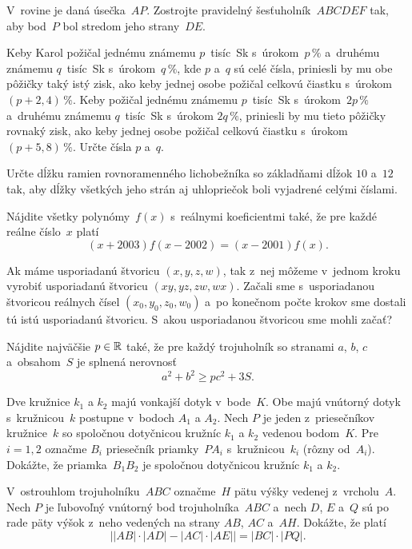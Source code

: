 {%
V~rovine je daná úsečka~$AP$. Zostrojte pravidelný šesťuholník~$ABCDEF$ tak, aby bod~$P$ bol stredom jeho strany~$DE$.}

{%
Keby Karol požičal jednému známemu $p$~tisíc~Sk s~úrokom~$p\,\%$ a~druhému známemu $q$~tisíc~Sk s~úrokom~$q\,\%$, kde $p$ a~$q$ sú celé čísla, priniesli by mu obe pôžičky taký istý zisk, ako keby jednej osobe požičal celkovú čiastku s~úrokom~$(p + 2{,}4)\,\%$. Keby požičal jednému známemu $p$~tisíc~Sk s~úrokom~$2p\,\%$ a~druhému známemu $q$~tisíc~Sk s~úrokom $2q\,\%$, priniesli by mu tieto pôžičky rovnaký zisk, ako keby jednej osobe požičal celkovú čiastku s~úrokom~$(p + 5{,}8)\,\%$. Určte čísla $p$ a~$q$.}

{%
Určte dĺžku ramien rovnoramenného lichobežníka so základňami dĺžok $10$ a~$12$ tak, aby dĺžky všetkých jeho strán aj uhlopriečok boli vyjadrené celými číslami.}

{%
Nájdite všetky polynómy~$f(x)$ s~reálnymi koeficientmi také, že pre každé
reálne číslo~$x$ platí
$$ (x+2003) f(x-2002) = (x-2001) f(x).$$}

{%
Ak máme usporiadanú štvoricu $(x,y,z,w)$, tak z~nej môžeme v~jednom kroku
vyrobiť usporiadanú štvoricu $(xy,yz,zw,wx)$.
Začali sme s~usporiadanou štvoricou reálnych čísel
$(x_0,y_0,z_0,w_0)$ a~po konečnom počte krokov sme dostali tú istú
usporiadanú štvoricu. S~akou usporiadanou štvoricou sme mohli začať?}

{%
Nájdite najväčšie $p \in \Bbb R$ také, že pre každý trojuholník
so stranami $a$, $b$, $c$ a~obsahom~$S$ je splnená nerovnosť
$$ a^2 + b^2 \ge pc^2 +3S.$$}

{%
Dve kružnice $k_1$ a $k_2$ majú vonkajší dotyk v~bode~$K$. Obe majú vnútorný dotyk
s~kružnicou~$k$ postupne v~bodoch $A_1$ a $A_2$. Nech $P$ je jeden z~priesečníkov
kružnice~$k$ so spoločnou dotyčnicou kružníc $k_1$ a $k_2$ vedenou bodom~$K$.
Pre $i=1,2$ označme $B_i$ priesečník priamky~$PA_i$ s~kružnicou~$k_i$ (rôzny od~$A_i$).
Dokážte, že priamka~$B_1B_2$ je spoločnou dotyčnicou kružníc $k_1$ a $k_2$.}

{%
V~ostrouhlom trojuholníku~$ABC$ označme~$H$ pätu výšky vedenej z~vrcholu~$A$. Nech $P$ je
ľubovoľný vnútorný bod trojuholníka~$ABC$ a~nech $D$, $E$ a~$Q$ sú po rade päty výšok z~neho
vedených na strany $AB$, $AC$ a~$AH$. Dokážte, že platí
$$
\bigl||AB|\cdot|AD|-|AC|\cdot|AE|\bigr|=|BC|\cdot|PQ|.
$$}


